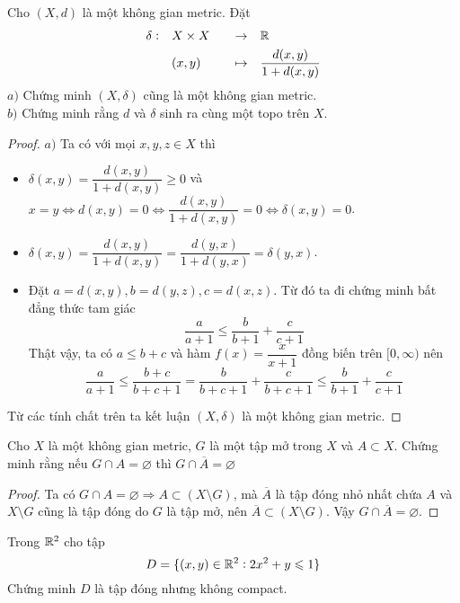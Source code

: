 \begin{exercise}{16}
    Cho $(X,d)$ là một không gian metric. Đặt
    \begin{alignat*}{3}
        \delta:\quad &X \times X\quad &\rightarrow &\quad \R\\
        & (x,y)\quad &\mapsto &\quad \frac{d(x,y)}{1+d(x,y)}
    \end{alignat*}
    $a)$ Chứng minh $(X,\delta)$ cũng là một không gian metric.\\
    $b)$ Chứng minh rằng $d$ và $\delta$ sinh ra cùng một topo trên $X$.
\end{exercise}

\begin{proof}
$a)$ Ta có với mọi $x, y, z \in X$ thì
\begin{itemize}
    \item $\delta(x,y) = \dfrac{d(x,y)}{1+d(x,y)} \geq 0$ và $x = y \Leftrightarrow d(x,y) = 0 \Leftrightarrow \dfrac{d(x,y)}{1+d(x,y)} = 0 \Leftrightarrow \delta(x,y) = 0$.
    \item $\delta(x,y) = \dfrac{d(x,y)}{1+d(x,y)} = \dfrac{d(y,x)}{1+d(y,x)} = \delta(y,x)$.
    \item Đặt $a = d(x,y), b = d(y,z), c = d(x, z)$. Từ đó ta đi chứng minh bất đẳng thức tam giác
    $$
        \dfrac{a}{a+1} \leq \dfrac{b}{b+1} + \dfrac{c}{c+1}
    $$
    Thật vậy, ta có $a \leq b + c$ và hàm $f(x) = \dfrac{x}{x+1}$ đồng biến trên $[0,\infty)$ nên
    $$
        \frac{a}{a+1} \leq \frac{b+c}{b+c+1} = \frac{b}{b+c+1} + \frac{c}{b+c+1} \leq \frac{b}{b+1} + \frac{c}{c+1}
    $$
\end{itemize}
Từ các tính chất trên ta kết luận $(X,\delta)$ là một không gian metric.
\end{proof}

\begin{exercise}{19}
    Cho $X$ là một không gian metric, $G$ là một tập mở trong $X$ và $A \subset X$. Chứng minh rằng nếu $G \cap A = \varnothing$ thì $G \cap \overline{A} = \varnothing$
\end{exercise}

\begin{proof}
Ta có $G \cap A = \varnothing \Rightarrow A \subset (X \setminus G)$, mà $\overline{A}$ là tập đóng nhỏ nhất chứa $A$ và $X \setminus G$ cũng là tập đóng do $G$ là tập mở, nên $\overline{A} \subset (X \setminus G)$. Vậy $G \cap \overline{A} = \varnothing$.
\end{proof}

\begin{exercise}{23} Trong $\mathbb R^2$ cho tập
    $$
        D = \{(x,y) \in \mathbb R^2 : 2x^2 + y \leqslant 1\}
    $$
    Chứng minh $D$ là tập đóng nhưng không compact.
\end{exercise}

